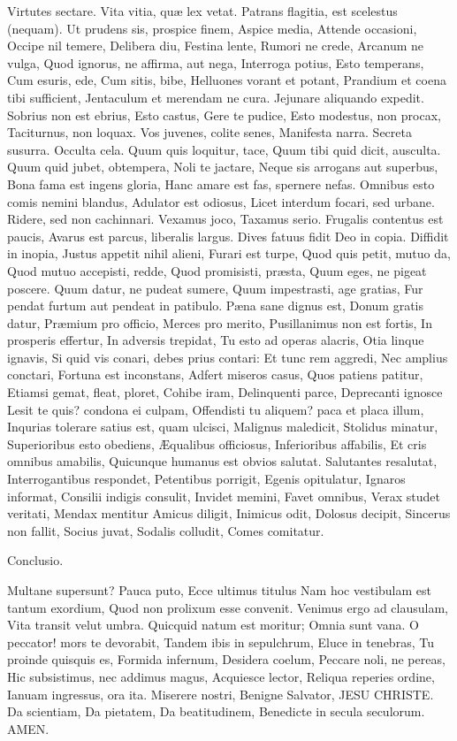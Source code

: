 \documentclass{book}
\begin{document}
Virtutes sectare.
Vita vitia, quæ lex vetat.
Patrans flagitia, est scelestus (nequam).
Ut prudens sis, prospice finem,
Aspice media,
Attende occasioni,
Occipe nil temere,
Delibera diu,
Festina lente,
Rumori ne crede,
Arcanum ne vulga,
Quod ignorus, ne affirma, aut nega,
Interroga potius,
Esto temperans,
Cum esuris, ede,
Cum sitis, bibe,
Helluones vorant et potant,
Prandium et coena tibi sufficient,
Jentaculum et merendam ne cura.
Jejunare aliquando expedit.
Sobrius non est ebrius,
Esto castus,
Gere te pudice,
Esto modestus, non procax,
Taciturnus, non loquax.
Vos juvenes, colite senes,
Manifesta narra.
Secreta susurra.
Occulta cela.
Quum quis loquitur, tace,
Quum tibi quid dicit, ausculta.
Quum quid jubet, obtempera,
Noli te jactare,
Neque sis arrogans aut superbus,
Bona fama est ingens gloria,
Hanc amare est fas,
spernere nefas.
Omnibus esto comis nemini blandus,
Adulator est odiosus,
Licet interdum focari, sed urbane.
Ridere, sed non cachinnari.
Vexamus joco,
Taxamus serio.
Frugalis contentus est paucis,
Avarus est parcus, liberalis largus.
Dives fatuus fidit Deo in copia.
Diffidit in inopia,
Justus appetit nihil alieni,
Furari est turpe,
Quod quis petit, mutuo da,
Quod mutuo accepisti, redde,
Quod promisisti, præsta,
Quum eges, ne pigeat poscere.
Quum datur, ne pudeat sumere,
Quum impestrasti, age gratias,
Fur pendat furtum aut pendeat in patibulo.
Pæna sane dignus est,
Donum gratis datur,
Præmium pro officio,
Merces pro merito,
Pusillanimus non est fortis,
In prosperis effertur,
In adversis trepidat,
Tu esto ad operas alacris,
Otia linque ignavis,
Si quid vis conari, debes prius contari:
Et tunc rem aggredi,
Nec amplius conctari,
Fortuna est inconstans,
Adfert miseros casus,
Quos patiens patitur,
Etiamsi gemat, fleat, ploret,
Cohibe iram,
Delinquenti parce,
Deprecanti ignosce
Lesit te quis? condona ei culpam,
Offendisti tu aliquem? paca et placa illum,
Inqurias tolerare satius est, quam ulcisci,
Malignus maledicit,
Stolidus minatur,
Superioribus esto obediens,
Æqualibus officiosus,
Inferioribus affabilis,
Et cris omnibus amabilis,
Quicunque humanus est obvios salutat.
Salutantes resalutat,
Interrogantibus respondet,
Petentibus porrigit,
Egenis opitulatur,
Ignaros informat,
Consilii indigis consulit,
Invidet memini,
Favet omnibus,
Verax studet veritati,
Mendax mentitur
Amicus diligit,
Inimicus odit,
Dolosus decipit,
Sincerus non fallit,
Socius juvat,
Sodalis colludit,
Comes comitatur.

Conclusio.

Multane supersunt?
Pauca puto,
Ecce ultimus titulus 
Nam hoc vestibulam est tantum exordium,
Quod non prolixum esse convenit.
Venimus ergo ad clausulam,
Vita transit velut umbra.
Quicquid natum est moritur;
Omnia sunt vana.
O peccator! mors te devorabit,
Tandem ibis in sepulchrum,
Eluce in tenebras,
Tu proinde quisquis es,
Formida infernum,
Desidera coelum,
Peccare noli, ne pereas,
Hic subsistimus, nec addimus magus,
Acquiesce lector,
Reliqua reperies ordine,
Ianuam ingressus, ora ita.
Miserere nostri,
Benigne Salvator,
JESU CHRISTE.
Da scientiam,
Da pietatem,
Da beatitudinem,
Benedicte in secula seculorum.
AMEN.
\end{document}
